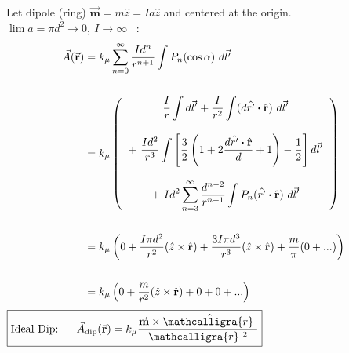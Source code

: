 \documentclass[12pt]{article}
\newcommand*{\bfr}{\mathbf{r}}
\newcommand{\scripty}[1]{\ensuremath{\mathcalligra{#1}}}
\newcommand*{\cursrr}{\scripty{r}\ }
\newcommand*{\dotP}{\boldsymbol \cdot}		%
\begin{document}
\begin{minipage}[t]{0.48\textwidth}
	Let dipole (ring) \( \vec{ \mathbf{m} } = m \hat{z} = Ia \hat{z} \) and centered at the origin. \\[15pt]
	\(\lim a = \pi d^2 \rightarrow 0, \ I \rightarrow \infty \) \ :
	\begin{align*}
		\vec{A}( \vec{ \mathbf{r} } ) &= k_\mu \sum_{n=0}^\infty 
			\frac{Id^n}{r^{n+1}} \int P_n (\cos{\alpha}) \ d\vec{l'}\\ \\
		&= k_\mu \left( 
				\begin{tabular}{c}
					\( \displaystyle \frac{I}{r} \int d\vec{l}' 
						+ \frac{I}{r^2} \int ( d \hat{r'} \dotP \hat{\bfr} ) \ d\vec{l}' \) \\ \\
					\( \displaystyle + \ \frac{Id^2}{r^3} \int 
						\left[ \frac{3}{2} \left( 1 + 2 \frac{d \hat{r'} \dotP \hat{\bfr}}{d} + 1 \right) 
						- \frac{1}{2} \right] d\vec{l}' \) \\ \\ 
					\( \displaystyle + \ I d^2 \sum_{n=3}^\infty \frac{d^{n-2}}{r^{n+1}} \int P_n (\hat{r'} \dotP \hat{\bfr}) \ d\vec{l}' \)	
				\end{tabular} 
			\right) \\ \\
		&= k_\mu \left( 0
			+ \frac{I \pi d^2}{r^2} ( \hat{z} \times \hat{\bfr} )
			+ \frac{3 I \pi d^3}{r^3} ( \hat{z} \times \hat{\bfr} )
			+ \frac{m}{\pi} (0 + ...) \right)\\ \\
		&= k_\mu \left( 0
			+ \frac{m}{r^2} ( \hat{z} \times \hat{\bfr} )
			+ 0 + 0 + ... \right)
	\end{align*}
	\hfill \break
	\( \boxed{ \text{Ideal Dip:} \ \ \ \ \ \vec{A}_{ \text{dip} }( \vec{ \mathbf{r} } ) 
		= k_\mu \frac{ \vec{ \mathbf{m} } \times \hat{\cursrr} }{\cursrr^{2}} } \)
\end{minipage}

\end{document}
